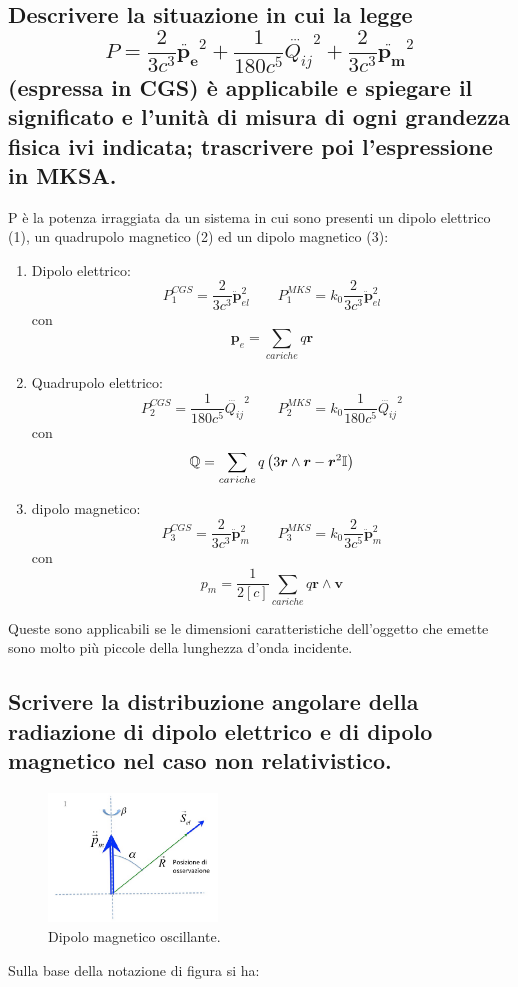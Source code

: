 \subsection[ Potenza irraggiata da dipolo elettrico, magnetico e quadrupolo elettrico]{Descrivere la situazione in cui la legge 
\[
	P = \frac{2}{3c^3} \ddot{\boldsymbol{p_{e}}}^2 + \frac{1}{180 c^5} \dddot{Q_{ij}}^2 + \frac{2}{3c^3} \ddot{\boldsymbol{p_m}}^2
\] 
(espressa in CGS) è applicabile e spiegare il significato e l'unità di misura di ogni grandezza fisica ivi indicata; trascrivere poi l'espressione in MKSA.}
P è la potenza irraggiata da un sistema in cui sono presenti un dipolo elettrico (1), un quadrupolo magnetico (2) ed un dipolo magnetico (3):
\begin{enumerate}
	\item Dipolo elettrico:
	\[
		P_{1}^{CGS} = \frac{2}{3 c^3} \ddot{\boldsymbol{p}}_{el}^2 \quad \quad 
		P_{1}^{MKS} = k_{0}\frac{2}{3 c^3} \ddot{\boldsymbol{p}}_{el}^2
	\]
	con
	\[
		\boldsymbol{p}_{e} = \sum_{cariche} q \boldsymbol{r} 
	\] 
	\item Quadrupolo elettrico:
	\[
		P_{2}^{CGS} = \frac{1}{180 c^{5}}\dddot{Q_{ij}}^2 \quad \quad 
		P_{2}^{MKS} = k_{0} \frac{1}{180 c^{5}} \dddot{Q_{ij}}^2
	\]
	con
	\[
		\mathbb{Q} = \sum_{cariche}q\left( 3 \boldsymbol{r} \wedge \boldsymbol{r} - \boldsymbol{r}^2\mathbb{I} \right) 
	\] 
	\item dipolo magnetico:
	\[
		P_{3}^{CGS} = \frac{2}{3c^{3}} \ddot{\boldsymbol{p}}_{m}^2 \quad \quad 
		P_{3}^{MKS} = k_{0} \frac{2}{3c^5} \ddot{\boldsymbol{p} }_{m}^2
	\]
	con
	\[
		p_{m} = \frac{1}{2[c]} \sum_{cariche} q \boldsymbol{r} \wedge \boldsymbol{v}   
	\] 
\end{enumerate}
Queste sono applicabili se le dimensioni caratteristiche dell'oggetto che emette sono molto più piccole della lunghezza d'onda incidente. 


\subsection[ Distribuzione angolare della radiazione di dipolo elettrico e magnetico (non relativistico)]{Scrivere la distribuzione angolare della radiazione di dipolo elettrico e di dipolo magnetico nel caso non relativistico.}
\begin{figure}[H]
	\centering
	\includegraphics[width=0.4\textwidth]{immagini/2.png}
	\caption{Dipolo magnetico oscillante.}
	\label{fig:2}
\end{figure}
Sulla base della notazione di figura si ha:
